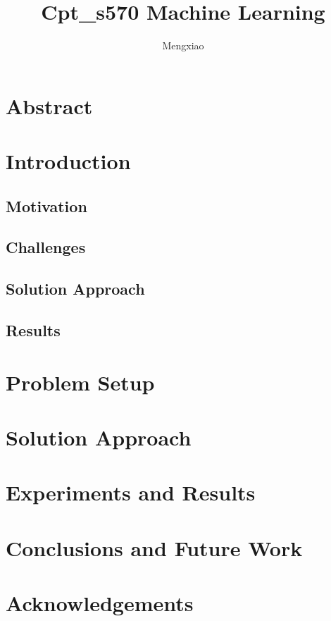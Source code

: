 \documentclass[12pt]{article}
\author{Mengxiao}
\title{Cpt\_s570 Machine Learning}
\begin{document}
    \maketitle
    \pagebreak
    \section{Abstract}
    \section{Introduction}
        \subsection{Motivation}
        \subsection{Challenges}
        \subsection{Solution Approach}
        \subsection{Results}
    \section{Problem Setup}
    \section{Solution Approach}
    \section{Experiments and Results}
    \section{Conclusions and Future Work}
    \section{Acknowledgements}
\end{document}
